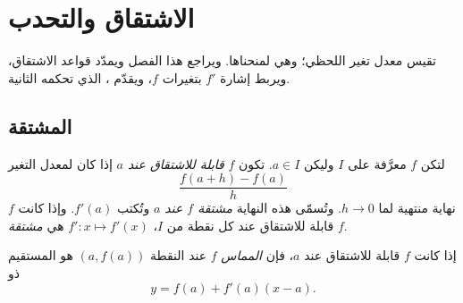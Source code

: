 \chapter{الاشتقاق والتحدب}\label{ch:g12:deriv}

تقيس  معدل تغير  اللحظي؛ وهي
  لمنحناها. ويراجع هذا الفصل ويمدّد
قواعد الاشتقاق، ويربط إشارة $f'$ بتغيرات $f$،
ويقدّم ، الذي تحكمه  الثانية.

\section{المشتقة}

\begin{definition}\label{def:g12:deriv:derivative}
لتكن $f$ معرَّفة على  $I$ وليكن $a \in I$. تكون  $f$
\emph{قابلة للاشتقاق عند $a$} إذا كان لمعدل التغير
\[
\frac{f(a+h) - f(a)}{h}
\]
نهاية منتهية لما $h \to 0$. وتُسمّى هذه النهاية \emph{مشتقة
$f$ عند $a$} وتُكتب $f'(a)$. وإذا كانت $f$ قابلة للاشتقاق عند كل نقطة من
$I$،  $f' \colon x \mapsto f'(x)$ هي \emph{مشتقة}
$f$.
\end{definition}

\begin{definition}[المماس]\label{def:g12:deriv:tangent}
إذا كانت $f$ قابلة للاشتقاق عند $a$، فإن \emph{المماس} 
$f$ عند النقطة $(a, f(a))$ هو المستقيم ذو 
\[
y = f(a) + f'(a)(x - a).
\]
\end{definition}

